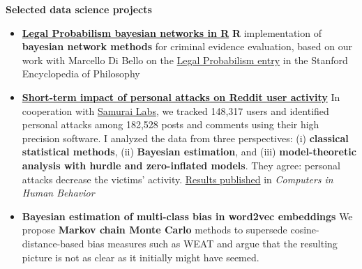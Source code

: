 \documentclass[10pt, a4paper]{article}
\begin{document}
\textbf{{\sc \Large Selected data science projects}}\\

\vspace{-6mm}

\begin{itemize} [leftmargin=*]
	
	
	
\item 	\href{https://rfl-urbaniak.github.io/LegalProbabilismBNs/}{\textbf{Legal Probabilism bayesian networks in R}} 
 \newline  \scriptsize \textbf{\textsf{R}} implementation  of \textbf{bayesian network methods} for criminal evidence evaluation, based on our work with  Marcello Di Bello on the \newline \href{https://plato.stanford.edu/entries/legal-probabilism/}{Legal  Probabilism entry} in the Stanford Encyclopedia of Philosophy


\vspace{-1mm}

\normalsize 
\item 	\href{https://rfl-urbaniak.github.io/redditAttacks/}{
	\textbf{Short-term impact of personal attacks on Reddit user  activity}} 
\newline  \scriptsize  In cooperation with \href{https://www.samurailabs.ai/}{Samurai Labs}, we tracked 148,317 users  and identified personal attacks among 182,528 posts and comments  using their high precision software. I  analyzed the data  from three perspectives: (i) \textbf{classical statistical methods}, (ii) \textbf{Bayesian estimation}, and (iii) \textbf{model-theoretic analysis with hurdle and zero-inflated models}. They  agree: personal attacks decrease the victims' activity. \href{https://www.sciencedirect.com/science/article/abs/pii/S0747563221002958}{Results published} in \emph{Computers in Human Behavior}


\vspace{-1mm}

\normalsize 
\item 	%
\textbf{Bayesian estimation of multi-class bias in word2vec embeddings}%
\newline  \scriptsize We  propose \textbf{Markov chain Monte Carlo} methods  to supersede cosine-distance-based bias measures such as WEAT and argue that the resulting picture is not as clear as it initially might have seemed. 




\end{itemize}
\end{document}

